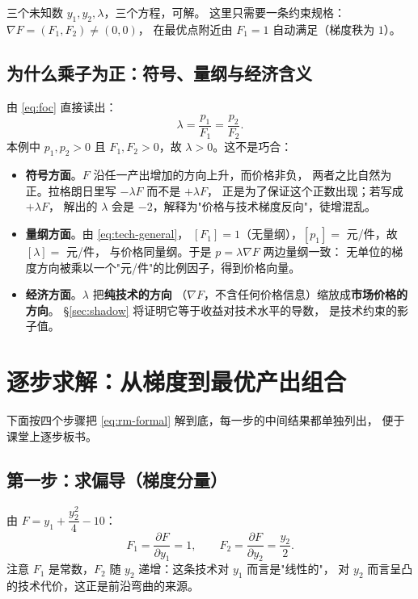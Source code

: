 三个未知数 $y_1,y_2,\lambda$，三个方程，可解。
这里只需要一条约束规格：$\nabla F=(F_1,F_2)\neq (0,0)$，
在最优点附近由 $F_1=1$ 自动满足（梯度秩为 $1$）。

\subsection{为什么乘子为正：符号、量纲与经济含义}

由 \eqref{eq:foc} 直接读出：
\begin{equation}
\lambda=\frac{p_1}{F_1}=\frac{p_2}{F_2}.
\label{eq:lambda-ratio}
\end{equation}
本例中 $p_1,p_2>0$ 且 $F_1,F_2>0$，故 $\lambda>0$。这不是巧合：

\begin{itemize}
  \item \textbf{符号方面}。$F$ 沿任一产出增加的方向上升，而价格非负，
        两者之比自然为正。拉格朗日里写 $-\lambda F$ 而不是 $+\lambda F$，
        正是为了保证这个正数出现；若写成 $+\lambda F$，
        解出的 $\lambda$ 会是 $-2$，解释为"价格与技术梯度反向"，徒增混乱。
  \item \textbf{量纲方面}。由 \eqref{eq:tech-general}，
        $[F_1]=1$（无量纲），$[p_1]=$ 元/件，故 $[\lambda]=$ 元/件，
        与价格同量纲。于是 $p=\lambda\nabla F$ 两边量纲一致：
        无单位的梯度方向被乘以一个"元/件"的比例因子，得到价格向量。
  \item \textbf{经济方面}。$\lambda$ 把\textbf{纯技术的方向}
        （$\nabla F$，不含任何价格信息）缩放成\textbf{市场价格的方向}。
        \S\ref{sec:shadow} 将证明它等于收益对技术水平的导数，
        是技术约束的影子值。
\end{itemize}

\section{逐步求解：从梯度到最优产出组合}
\label{sec:solve}

下面按四个步骤把 \eqref{eq:rm-formal} 解到底，每一步的中间结果都单独列出，
便于课堂上逐步板书。

\subsection{第一步：求偏导（梯度分量）}

由 $F=y_1+\dfrac{y_2^{2}}{4}-10$：
\begin{equation}
F_1=\frac{\partial F}{\partial y_1}=1,
\qquad
F_2=\frac{\partial F}{\partial y_2}=\frac{y_2}{2}.
\label{eq:grad-components}
\end{equation}
注意 $F_1$ 是常数，$F_2$ 随 $y_2$ 递增：这条技术对 $y_1$ 而言是"线性的"，
对 $y_2$ 而言呈凸的技术代价，这正是前沿弯曲的来源。

